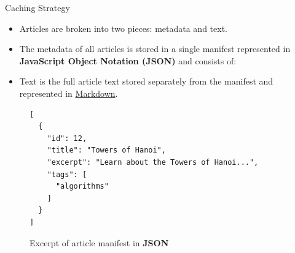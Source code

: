 \documentclass{beamer}
\begin{document}
\begin{frame}{Caching Strategy}
    \begin{itemize}
        \item Articles are broken into two pieces: metadata and text.
        \item The metadata of all articles is stored in a single manifest
            represented in \textbf{JavaScript Object Notation (JSON)} and
            consists of:
        \item Text is the full article text stored separately from the manifest
            and represented in
            \href{https://daringfireball.net/projects/markdown/}{Markdown}.
    \end{itemize}
    \begin{figure}
    \begin{verbatim}
[
  {
    "id": 12,
    "title": "Towers of Hanoi",
    "excerpt": "Learn about the Towers of Hanoi...",
    "tags": [
      "algorithms"
    ]
  }
]
    \end{verbatim}
    \caption{Excerpt of article manifest in \textbf{JSON}}
    \end{figure}
\end{frame}
\end{document}
